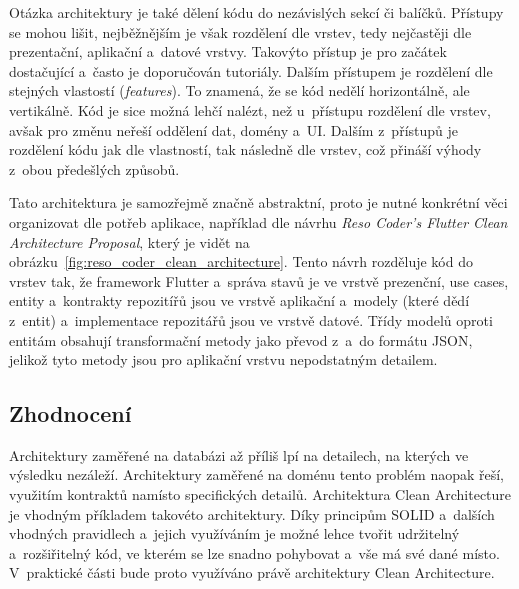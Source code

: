 Otázka architektury je také dělení kódu do nezávislých sekcí či balíčků.
Přístupy se mohou lišit,
nejběžnějším je však rozdělení dle vrstev,
tedy nejčastěji dle prezentační, aplikační a~datové vrstvy.
Takovýto přístup je pro začátek dostačující a~často je doporučován tutoriály.
Dalším přístupem je rozdělení dle stejných vlastostí (\emph{features}).
To znamená,
že se kód nedělí horizontálně,
ale vertikálně.
Kód je sice možná lehčí nalézt,
než u~přístupu rozdělení dle vrstev,
avšak pro změnu neřeší oddělení dat, domény a~UI.
\pagebreak[4]
Dalším z~přístupů je rozdělení kódu jak dle vlastností,
tak následně dle vrstev,
což přináší výhody z~obou předešlých
způsobů.~\cite[str.~303--321]{martin_clean_architecture}

Tato architektura je samozřejmě značně abstraktní,
proto je nutné konkrétní věci organizovat dle potřeb aplikace,
například dle návrhu \emph{Reso Coder's Flutter Clean Architecture Proposal},
který je vidět na obrázku~\ref{fig:reso_coder_clean_architecture}.
Tento návrh rozděluje kód do vrstev tak,
že framework Flutter a~správa stavů je ve vrstvě prezenční,
use cases, entity a~kontrakty repozitířů jsou ve vrstvě aplikační
a~modely (které dědí z~entit) a~implementace repozitářů jsou ve vrstvě datové.
Třídy modelů oproti entitám obsahují transformační metody jako
převod z~a~do formátu JSON,
jelikož tyto metody jsou pro aplikační vrstvu nepodstatným
detailem.~\cite{reso_coder_clean_architecture}

\subsection{Zhodnocení}

Architektury zaměřené na databázi až příliš lpí na detailech,
na kterých ve výsledku nezáleží.
Architektury zaměřené na doménu tento problém naopak řeší,
využitím kontraktů namísto specifických detailů.
Architektura Clean Architecture je vhodným příkladem takovéto architektury.
Díky principům SOLID a~dalších vhodných pravidlech a~jejich využíváním
je možné lehce tvořit udržitelný a~rozšiřitelný kód,
ve kterém se lze snadno pohybovat a~vše má své dané místo.
V~praktické části bude proto využíváno právě architektury Clean Architecture.
